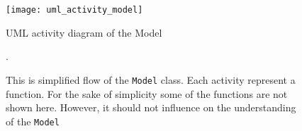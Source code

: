 \begin{figure}[H]
	\texttt{[image: uml\_activity\_model]}
	\caption{UML activity diagram of the Model}
	\caption*{This is simplified flow of the \lstinline{Model} class.
	Each activity represent a function. For the sake of simplicity some of the functions
	are not shown here. However, it should not influence on the understanding
	of the \lstinline{Model}}.
	\label{fig:uml_activity_model}
\end{figure}
%
%






